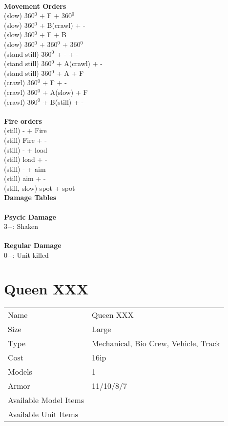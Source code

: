 \ \\ {\bf Movement Orders } \\
(slow) 360$^0$ + F + 360$^0$ \\
(slow) 360$^0$ + B(crawl) + - \\
(slow) 360$^0$ + F + B \\
(slow) 360$^0$ + 360$^0$ + 360$^0$ \\
(stand still) 360$^0$ + - + -  \\
(stand still) 360$^0$ + A(crawl) + - \\
(stand still) 360$^0$ + A + F \\
(crawl) 360$^0$ + F + - \\
(crawl) 360$^0$ + A(slow) + F \\
(crawl) 360$^0$ + B(still) + - \\
\ \\ {\bf Fire orders } \\
(still) - + Fire \\
(still) Fire + -  \\
(still) - + load \\
(still) load + - \\
(still) - + aim \\
(still) aim + -  \\
(still, slow) spot + spot \\



{\bf Damage Tables} \\
\ \\ {\bf Psycic Damage } \\
3+: Shaken \\
\ \\ {\bf Regular Damage } \\
0+: Unit killed \\









\pagebreak

\section{ Queen XXX }

\begin{tabular}{ll}
  Name & Queen XXX \\
  Size & Large\\
  Type & Mechanical, Bio Crew, Vehicle, Track\\
  Cost & 16ip\\
  Models & 1\\
  Armor & 11/10/8/7\\
  Available Model Items &  \\
  Available Unit Items &  \\
\end{tabular}

